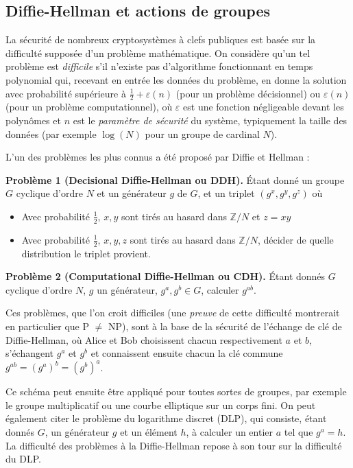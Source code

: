 \documentclass[11pt,a4paper]{article}
\newcommand{\Z}{\mathbb{Z}}
\theoremstyle{definition}
\begin{document}
\subsection{Diffie-Hellman et actions de groupes}


La sécurité de nombreux cryptosystèmes à clefs publiques est basée sur la difficulté supposée d'un problème mathématique. On considère qu'un tel problème est \emph{difficile} s'il n'existe pas d'algorithme fonctionnant en temps polynomial qui, recevant en entrée les données du problème, en donne la solution avec probabilité supérieure à $\frac{1}{2}+\varepsilon(n)$ (pour un problème décisionnel) ou $\varepsilon(n)$ (pour un problème computationnel), où $\varepsilon$ est une fonction négligeable devant les polynômes et $n$ est le \emph{paramètre de sécurité} du système, typiquement la taille des données (par exemple $\log(N)$ pour un groupe de cardinal $N$).

L'un des problèmes les plus connus a été proposé par Diffie et Hellman :

\textbf{Problème 1 (Decisional Diffie-Hellman ou DDH).} \'Etant donné un groupe $G$ cyclique d'ordre $N$ et un générateur $g$ de $G$, et un triplet $(g^x,g^y,g^z)$ où
\begin{itemize}
\item Avec probabilité $\frac{1}{2}$, $x,y$ sont tirés au hasard dans $\Z/N$ et $z=xy$
\item Avec probabilité $\frac{1}{2}$, $x,y,z$ sont tirés au hasard dans $\Z/N$,
décider de quelle distribution le triplet provient.
\end{itemize}

\textbf{Problème 2 (Computational Diffie-Hellman ou CDH).} \'Etant donnés $G$ cyclique d'ordre $N$, $g$ un générateur, $g^a,g^b\in G$, calculer $g^{ab}$.

Ces problèmes, que l'on croit difficiles (une \emph{preuve} de cette difficulté montrerait en particulier que P $\neq$ NP), sont à la base de la sécurité de l'échange de clé de Diffie-Hellman, où Alice et Bob choisissent chacun respectivement $a$ et $b$, s'échangent $g^a$ et $g^b$ et connaissent ensuite chacun la clé commune $g^{ab}=(g^a)^b=(g^b)^a$.

Ce schéma peut ensuite être appliqué pour toutes sortes de groupes, par exemple le groupe multiplicatif ou une courbe elliptique sur un corps fini. On peut également citer le problème du logarithme discret (DLP), qui consiste, étant donnés $G$, un générateur $g$ et un élément $h$, à calculer un entier $a$ tel que $g^a=h$. La difficulté des problèmes à la Diffie-Hellman repose à son tour sur la difficulté du DLP.
\end{document}
